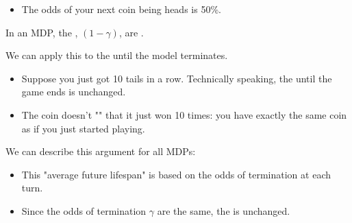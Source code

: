         \begin{itemize}
            \item The odds of your next coin being heads is  50\%.
        \end{itemize}

        \begin{concept}
            In an MDP, the , $(1-\gamma)$, are .
        \end{concept}

        \subsecdiv

        We can apply this to the  until the model terminates.

        \begin{itemize}
            \item \miniex Suppose you just got 10 tails in a row. Technically speaking, the  until the game ends is unchanged.
            \item The coin doesn't "" that it just won 10 times: you have exactly the same coin as if you just started playing.
        \end{itemize}

        We can describe this argument for all MDPs:

        \begin{itemize}
            \item This "average future lifespan" is based on the odds of termination at each turn.
            \item Since the odds of termination $\gamma$ are the same, the  is unchanged.\\
        \end{itemize}

